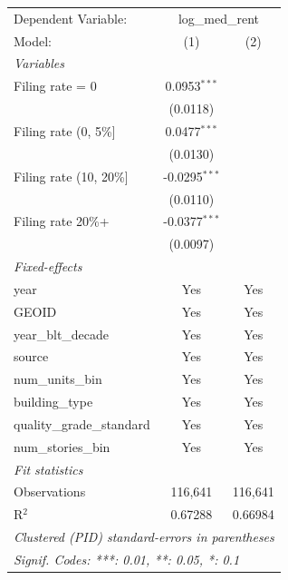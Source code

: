 \begingroup
\centering
\begin{tabular}{lcc}
   \tabularnewline \midrule \midrule
   Dependent Variable: & \multicolumn{2}{c}{log\_med\_rent}\\
   Model:                     & (1)             & (2)\\  
   \midrule
   \emph{Variables}\\
   Filing rate = 0            & 0.0953$^{***}$  &   \\   
                              & (0.0118)        &   \\   
   Filing rate (0, 5\%]       & 0.0477$^{***}$  &   \\   
                              & (0.0130)        &   \\   
   Filing rate (10, 20\%]     & -0.0295$^{***}$ &   \\   
                              & (0.0110)        &   \\   
   Filing rate 20\%+          & -0.0377$^{***}$ &   \\   
                              & (0.0097)        &   \\   
   \midrule
   \emph{Fixed-effects}\\
   year                       & Yes             & Yes\\  
   GEOID                      & Yes             & Yes\\  
   year\_blt\_decade          & Yes             & Yes\\  
   source                     & Yes             & Yes\\  
   num\_units\_bin            & Yes             & Yes\\  
   building\_type             & Yes             & Yes\\  
   quality\_grade\_standard   & Yes             & Yes\\  
   num\_stories\_bin          & Yes             & Yes\\  
   \midrule
   \emph{Fit statistics}\\
   Observations               & 116,641         & 116,641\\  
   R$^2$                      & 0.67288         & 0.66984\\  
   \midrule \midrule
   \multicolumn{3}{l}{\emph{Clustered (PID) standard-errors in parentheses}}\\
   \multicolumn{3}{l}{\emph{Signif. Codes: ***: 0.01, **: 0.05, *: 0.1}}\\
\end{tabular}
\par\endgroup
